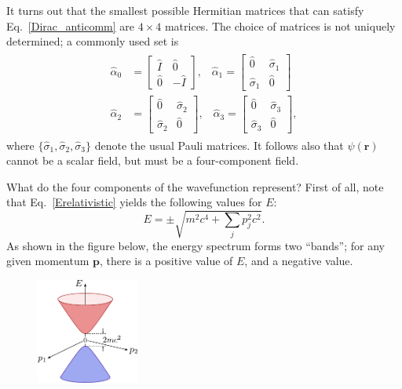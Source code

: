 \documentclass[pra,12pt]{revtex4}
\begin{document}
It turns out that the smallest possible Hermitian matrices that can
satisfy Eq.~\eqref{Dirac_anticomm} are $4\times4$ matrices.  The
choice of matrices is not uniquely determined; a commonly used set is
\begin{align}
  \begin{aligned}
    \hat{\alpha}_0 &= \begin{bmatrix}
      \hat{I}\, & \hat{0} \\ \hat{0} & -\hat{I}
    \end{bmatrix}, \;\;\;
    \hat{\alpha}_1 = \begin{bmatrix}
      \hat{0} & \hat{\sigma}_1 \\ \hat{\sigma}_1 & \hat{0}
    \end{bmatrix} \\
    \hat{\alpha}_2 &= \begin{bmatrix}
      \hat{0} & \hat{\sigma}_2 \\ \hat{\sigma}_2 & \hat{0}
    \end{bmatrix}, \;\;\;
    \hat{\alpha}_3 = \begin{bmatrix}
      \hat{0} & \hat{\sigma}_3 \\ \hat{\sigma}_3 & \hat{0}
    \end{bmatrix},
  \end{aligned}
  \label{alpha_matrices}
\end{align}
where $\{\hat{\sigma}_{1}, \hat{\sigma}_{2}, \hat{\sigma}_{3}\}$
denote the usual Pauli matrices.  It follows also that
$\psi(\mathbf{r})$ cannot be a scalar field, but must be a
four-component field.

What do the four components of the wavefunction represent?  First of
all, note that Eq.~\eqref{Erelativistic} yields the following values
for $E$:
\begin{equation}
  E = \pm \sqrt{m^2c^4 + \sum_{j} p_j^2c^2}.
\end{equation}
As shown in the figure below, the energy spectrum forms two ``bands'';
for any given momentum $\mathbf{p}$, there is a positive value of $E$,
and a negative value.

\begin{figure}[h]
  \centering\includegraphics[width=0.3\textwidth]{diraccone}
\end{figure}
\end{document}
